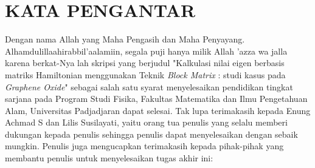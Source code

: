 \documentclass[12pt,a4paper]{report}
\begin{document}
\chapter*{\centering KATA PENGANTAR}
\thispagestyle{myplain}
 \hspace{5mm} 
 Dengan nama Allah yang Maha Pengasih dan Maha Penyayang. Alhamdulillaahirabbil'aalamiin, segala puji hanya milik Allah 'azza wa jalla karena berkat-Nya lah skripsi yang berjudul "Kalkulasi nilai eigen berbasis matriks Hamiltonian menggunakan Teknik \textit{Block Matrix} : studi kasus pada \textit{Graphene Oxide}" sebagai salah satu syarat menyelesaikan pendidikan tingkat sarjana pada Program Studi Fisika, Fakultas Matematika dan Ilmu Pengetahuan Alam, Universitas Padjadjaran dapat selesai. Tak lupa terimakasih kepada Enung Achmad S dan Lilis Susilayati, yaitu orang tua penulis yang selalu memberi dukungan kepada penulis sehingga penulis dapat menyelesaikan dengan sebaik mungkin. Penulis juga mengucapkan terimakasih kepada pihak-pihak yang membantu penulis untuk menyelesaikan tugas akhir ini:
\end{document}
